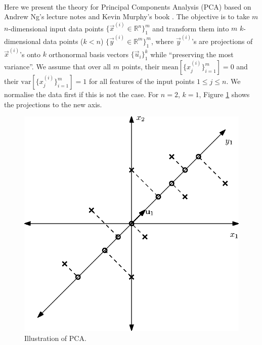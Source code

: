 \paragraph{}
	Here we present the theory for Principal Components Analysis (PCA) based on Andrew Ng's lecture notes \cite{ng13} and Kevin Murphy's book \cite{mlBook}. The objective is to take $m$ $n$-dimensional input data points $\{\vec x^{(i)} \in \mathbb{R}^n\}_1^m$ and transform them into $m$ $k$-dimensional data points ($k<n$) $\{\vec y^{(i)} \in \mathbb{R}^m\}_1^m$, where $\vec y^{(i)}$'s are projections of $\vec x^{(i)}$'s onto $k$ orthonormal basis vectors $\{\vec u_i\}_1^k$ while ``preserving the most variance''. We assume that over all $m$ points, their $\text{mean}\left[\{x^{(i)}_j\}_{i = 1}^m\right] = 0$ and their $\text{var}\left[\{x^{(i)}_j\}_{i = 1}^m\right] = 1$ for all features of the input points $1 \leq j \leq n$. We normalise the data first if this is not the case. For $n = 2$, $k = 1$, Figure \ref{fig:pca} shows the projections to the new axis.
\begin{figure}[h!]
	\centering
		\includegraphics{drawings/pca.eps}
	\caption{Illustration of PCA.}
	\label{fig:pca}
\end{figure}

